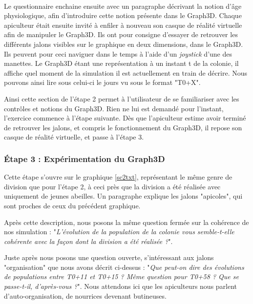 		\paragraph{}
		Le questionnaire enchaine ensuite avec un paragraphe décrivant la notion d'âge physiologique, afin d'introduire cette notion présente dans le Graph3D. Chaque apiculteur était ensuite invité à enfiler à nouveau son casque de réalité virtuelle afin de manipuler le Graph3D. Ils ont pour consigne d'essayer de retrouver les différents jalons visibles sur le graphique en deux dimensions, dans le Graph3D. Ils peuvent pour ceci naviguer dans le temps à l'aide d'un \textit{joystick} d'une des manettes. Le Graph3D étant une représentation à un instant t de la colonie, il affiche quel moment de la simulation il est actuellement en train de décrire. Nous pouvons ainsi lire sous celui-ci le jours vu sous le format "T0+X".
		
		Ainsi cette section de l'étape 2 permet à l'utilisateur de se familiariser avec les contrôles et notions du Graph3D. Rien ne lui est demandé pour l'instant, l'exercice commence à l'étape suivante. Dès que l'apiculteur estime avoir terminé de retrouver les jalons, et compris le fonctionnement du Graph3D, il repose son casque de réalité virtuelle, et passe à l'étape 3.
		
		\subsubsection{Étape 3 : Expérimentation du Graph3D}
			Cette étape s'ouvre sur le graphique \ref{sc2txt}, représentant le même genre de division que pour l'étape 2, à ceci près que la division a été réalisée avec uniquement de jeunes abeilles. Un paragraphe explique les jalons "apicoles", qui sont proches de ceux du précédent graphique.
			
			Après cette description, nous posons la même question fermée sur la cohérence de nos simulation : "\textit{L'évolution de la population de la colonie vous semble-t-elle cohérente avec la façon dont la division a été réalisée ?}".
			
			Juste après nous posons une question ouverte, s'intéressant aux jalons "organisation" que nous avons décrit ci-dessus : "\textit{Que peut-on dire des évolutions de populations entre T0+11 et T0+15 ? Même question pour T0+58 ? Que se passe-t-il, d'après-vous ?}". Nous attendons ici que les apiculteurs nous parlent d'auto-organisation, de nourrices devenant butineuses.
			
